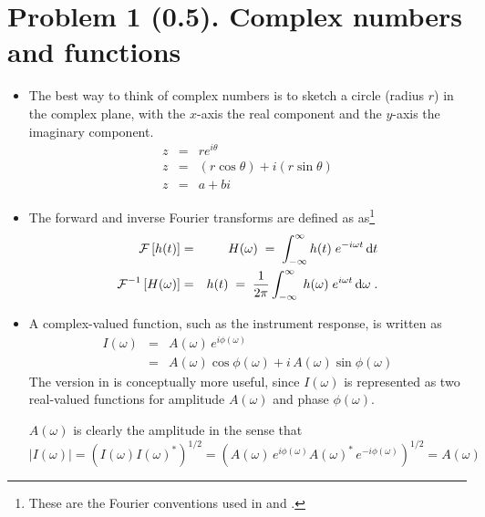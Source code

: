 \documentclass[11pt,titlepage,fleqn]{article}
\newcommand{\fft}{h}
\newcommand{\ffw}{H}
\begin{document}

\pagebreak
\section*{Problem 1 (0.5). Complex numbers and functions}

\begin{itemize}
\item The best way to think of complex numbers is to sketch a circle (radius $r$) in the complex plane, with the $x$-axis the real component and the $y$-axis the imaginary component.
%
\begin{eqnarray*}
z &=& r e^{i\theta}
\\
z &=& (r\cos\theta) + i(r\sin\theta)
\\
z &=& a + bi
\end{eqnarray*}



\item The forward and inverse Fourier transforms are defined as as\footnote{These are the Fourier conventions used in \citet[][p.~109]{DT} and \citet[][Section 6.4.2]{SteinWysession}.}
%
\begin{eqnarray}
\cF \left[ \fft(t) \right] &=& \ffw(\omega)
\;=\; \int_{-\infty}^{\infty} \fft(t) \; e^{-i\omega t} \,\rmd t
\label{fft}
\\
\cF^{-1} \left[ \ffw(\omega) \right] &=& \fft(t) 
\;=\; \frac{1}{2\pi} \int_{-\infty}^{\infty} \; \fft(\omega) \; e^{i\omega t} \,\rmd\omega 
\label{ifft}
\;.
\end{eqnarray}


\item A complex-valued function, such as the instrument response, is written as
%
\begin{eqnarray}
I(\omega) &=& A(\omega)\,e^{i\phi(\omega)}
\label{Iw}
\\
&=& A(\omega)\cos\phi(\omega) + i\,A(\omega)\sin\phi(\omega)
\end{eqnarray}
%
The version in  is conceptually more useful, since $I(\omega)$ is represented as two real-valued functions for amplitude $A(\omega)$ and phase $\phi(\omega)$.

$A(\omega)$ is clearly the amplitude in the sense that
%
\begin{equation}
|I(\omega)| = \left( I(\omega) I(\omega)^* \right)^{1/2}
= \left( A(\omega)\,e^{i\phi(\omega)} A(\omega)^*\,e^{-i\phi(\omega)} \right)^{1/2}
= A(\omega)
\end{equation}

\end{itemize}
\end{document}
